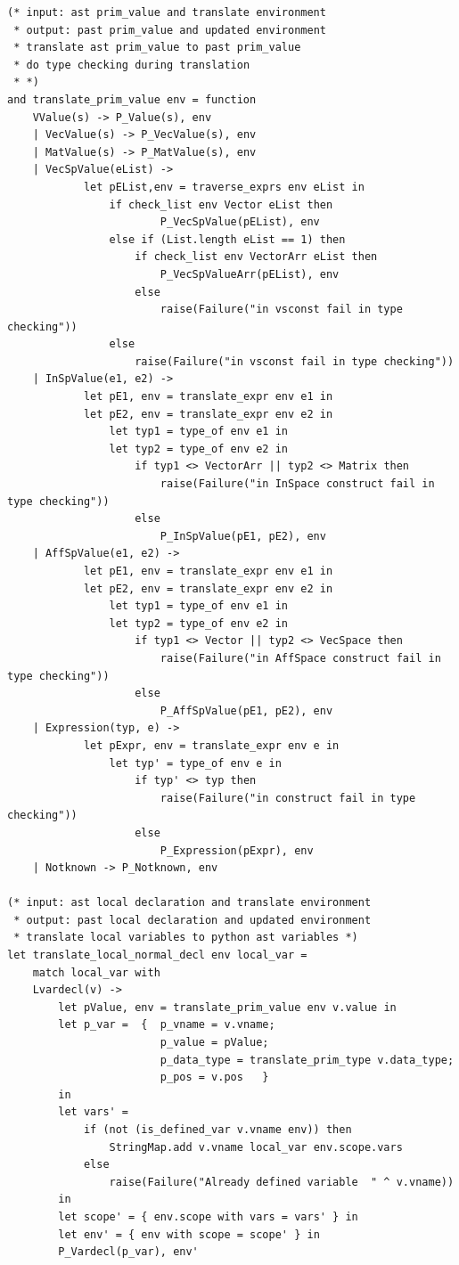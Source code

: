 \documentclass[12pt]{article} %
\begin{document}
\begin{lstlisting}[style=appendix, caption=translate.ml]
(* input: ast prim_value and translate environment
 * output: past prim_value and updated environment
 * translate ast prim_value to past prim_value
 * do type checking during translation
 * *)
and translate_prim_value env = function
    VValue(s) -> P_Value(s), env
    | VecValue(s) -> P_VecValue(s), env 
    | MatValue(s) -> P_MatValue(s), env
    | VecSpValue(eList) -> 
            let pEList,env = traverse_exprs env eList in
                if check_list env Vector eList then
                        P_VecSpValue(pEList), env
                else if (List.length eList == 1) then
                    if check_list env VectorArr eList then
                        P_VecSpValueArr(pEList), env
                    else
                        raise(Failure("in vsconst fail in type checking"))
                else
                    raise(Failure("in vsconst fail in type checking"))
    | InSpValue(e1, e2) -> 
            let pE1, env = translate_expr env e1 in
            let pE2, env = translate_expr env e2 in
                let typ1 = type_of env e1 in
                let typ2 = type_of env e2 in
                    if typ1 <> VectorArr || typ2 <> Matrix then
                        raise(Failure("in InSpace construct fail in type checking"))
                    else    
                        P_InSpValue(pE1, pE2), env            
    | AffSpValue(e1, e2) -> 
            let pE1, env = translate_expr env e1 in
            let pE2, env = translate_expr env e2 in
                let typ1 = type_of env e1 in
                let typ2 = type_of env e2 in
                    if typ1 <> Vector || typ2 <> VecSpace then
                        raise(Failure("in AffSpace construct fail in type checking"))
                    else
                        P_AffSpValue(pE1, pE2), env 
    | Expression(typ, e) -> 
            let pExpr, env = translate_expr env e in
                let typ' = type_of env e in
                    if typ' <> typ then
                        raise(Failure("in construct fail in type checking"))
                    else
                        P_Expression(pExpr), env
    | Notknown -> P_Notknown, env
   
(* input: ast local declaration and translate environment
 * output: past local declaration and updated environment
 * translate local variables to python ast variables *)
let translate_local_normal_decl env local_var = 
    match local_var with
    Lvardecl(v) ->
        let pValue, env = translate_prim_value env v.value in
        let p_var =  {  p_vname = v.vname; 
                        p_value = pValue; 
                        p_data_type = translate_prim_type v.data_type; 
                        p_pos = v.pos   } 
        in
        let vars' = 
            if (not (is_defined_var v.vname env)) then
                StringMap.add v.vname local_var env.scope.vars
            else
                raise(Failure("Already defined variable  " ^ v.vname))
        in
        let scope' = { env.scope with vars = vars' } in
        let env' = { env with scope = scope' } in
        P_Vardecl(p_var), env'
           

\end{lstlisting}
\end{document}
